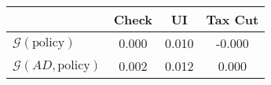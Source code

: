 \begin{tabular}{@{}lccc@{}} 
\toprule 
                          & Check      & UI    & Tax Cut    \\  \midrule 
$\mathcal{G}(\text{policy})$ & 0.000  & 0.010  & -0.000     \\ 
$\mathcal{G}(AD,\text{policy})$ & 0.002  & 0.012  & 0.000     \\ 
\end{tabular}  
